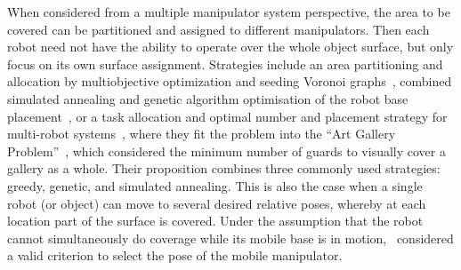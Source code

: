\documentclass[letterpaper, 10pt, conference]{ieeeconf}
\begin{document}
When considered from a multiple manipulator system perspective, the area to be covered can be partitioned and assigned to different manipulators. 
Then each robot need not have the ability to operate over the whole object surface, but only focus on its own surface assignment. Strategies include
an area partitioning and allocation by multiobjective optimization and seeding Voronoi graphs~\cite{Hassan2014Task}, combined simulated annealing and genetic algorithm optimisation of the robot base placement~\cite{Hassan2016Modelling}, or a task allocation and optimal number and placement strategy for multi-robot systems~\cite{Kalawoun2018Optimal}, where they fit the problem into the ``Art Gallery Problem''~\cite{Kahn2006Traditional},  which considered the minimum number of guards to visually cover a gallery as a whole. Their proposition combines three commonly used strategies: greedy, genetic, and simulated annealing. 
This is also the case when a single robot (or object) can move to several desired relative poses, whereby at each location part of the surface is covered. Under the assumption that the robot cannot simultaneously do coverage while its mobile base is in motion,~\cite{paus2017a} considered a valid criterion to select the pose of the mobile manipulator. 
\end{document}
